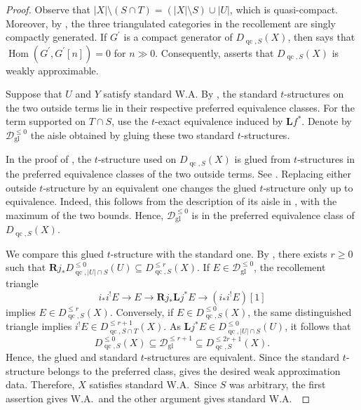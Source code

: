 \documentclass[11pt]{amsart}
\theoremstyle{plain}
\theoremstyle{definition}
\numberwithin{equation}{section}
\numberwithin{theorem}{section}
\begin{document}
\begin{proof}
    Observe that $|X|\setminus (S\cap T) = (|X|\setminus S)\cup |U|$, which is quasi-compact.
    Moreover, by \cite[\href{https://stacks.math.columbia.edu/tag/0AEC}{Tag 0AEC}]{StacksProject}, the three triangulated categories in the recollement are singly compactly generated.
    If $G^\prime$ is a compact generator of $D_{\operatorname{qc},S}(X)$, then  says that $\operatorname{Hom}(G^\prime,G^\prime[n])=0$ for $n\gg 0$.
    Consequently,  asserts that $D_{\operatorname{qc},S}(X)$ is weakly approximable.

    Suppose that $U$ and $Y$ satisfy standard W.A.
    By \cite[Facts 1.26(i)]{Neeman:2026}, the standard $t$-structures on the two outside terms lie in their respective preferred equivalence classes. For the term supported on $T\cap S$, use the $t$-exact equivalence induced by $\mathbf{L}f^\ast$.
    Denote by $\mathcal{D}^{\leq 0}_{\mathrm{gl}}$ the aisle obtained by gluing these two standard $t$-structures.

    In the proof of , the $t$-structure
    used on $D_{\operatorname{qc},S}(X)$ is glued from $t$-structures
    in the preferred equivalence classes of the two outside terms.
    See . 
    Replacing either outside $t$-structure by an equivalent one changes the glued $t$-structure only up to equivalence. 
    Indeed, this follows from the description of its aisle in , with the maximum of the two bounds. 
    Hence, $\mathcal{D}^{\leq 0}_{\mathrm{gl}}$ is in the preferred equivalence class of $D_{\operatorname{qc},S}(X)$.

    We compare this glued $t$-structure with the standard one.
    By , there exists $r\geq 0$ such that $\mathbf{R}j_\ast D^{\leq 0}_{\operatorname{qc},|U|\cap S}(U) \subseteq D^{\leq r}_{\operatorname{qc},S}(X)$.
    If $E\in\mathcal{D}^{\leq 0}_{\mathrm{gl}}$, the recollement triangle
    \begin{displaymath}
        i_\ast i^! E\to E\to
        \mathbf{R}j_\ast\mathbf{L}j^\ast E\to (i_\ast i^! E)[1]
    \end{displaymath}
    implies $E\in D^{\leq r}_{\operatorname{qc},S}(X)$.
    Conversely, if $E\in D^{\leq 0}_{\operatorname{qc},S}(X)$, the same distinguished triangle implies $i^! E\in D^{\leq r+1}_{\operatorname{qc},S\cap T}(X)$.
    As $\mathbf{L}j^\ast E\in
    D^{\leq 0}_{\operatorname{qc},|U|\cap S}(U)$, it follows that
    \begin{displaymath}
        D^{\leq 0}_{\operatorname{qc},S}(X)
        \subseteq \mathcal{D}^{\leq r+1}_{\mathrm{gl}}
        \subseteq D^{\leq 2r+1}_{\operatorname{qc},S}(X).
    \end{displaymath}
    Hence, the glued and standard $t$-structures are equivalent.
    Since the standard $t$-structure belongs to the preferred class,
    \cite[Lemma 3.7]{Burke/Neeman/Pauwels:2023} gives the desired weak approximation data. 
    Therefore, $X$ satisfies standard W.A.\
    Since $S$ was arbitrary, the first assertion gives W.A.\ and the other argument gives standard W.A.\
\end{proof}
\end{document}
